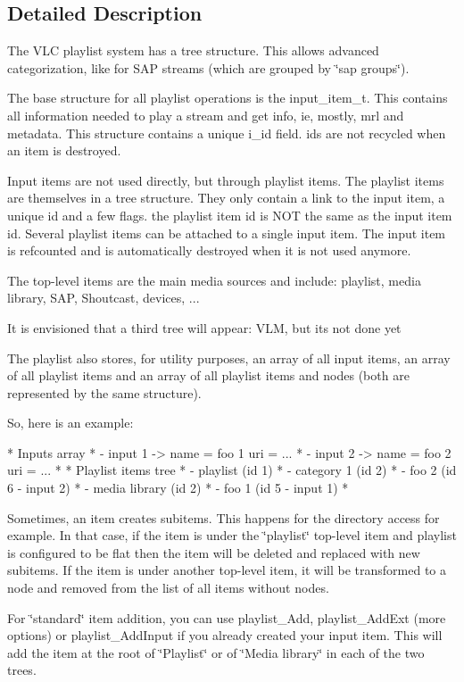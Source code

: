 \subsection{Detailed Description}
The V\+LC playlist system has a tree structure. This allows advanced categorization, like for S\+AP streams (which are grouped by \char`\"{}sap groups\char`\"{}).

The base structure for all playlist operations is the input\+\_\+item\+\_\+t. This contains all information needed to play a stream and get info, ie, mostly, mrl and metadata. This structure contains a unique i\+\_\+id field. ids are not recycled when an item is destroyed.

Input items are not used directly, but through playlist items. The playlist items are themselves in a tree structure. They only contain a link to the input item, a unique id and a few flags. the playlist item id is N\+OT the same as the input item id. Several playlist items can be attached to a single input item. The input item is refcounted and is automatically destroyed when it is not used anymore.

The top-\/level items are the main media sources and include\+: playlist, media library, S\+AP, Shoutcast, devices, ...

It is envisioned that a third tree will appear\+: V\+LM, but it\textquotesingle{}s not done yet

The playlist also stores, for utility purposes, an array of all input items, an array of all playlist items and an array of all playlist items and nodes (both are represented by the same structure).

So, here is an example\+: \begin{DoxyVerb}* Inputs array
*  - input 1 -> name = foo 1 uri = ...
*  - input 2 -> name = foo 2 uri = ...
*
* Playlist items tree
* - playlist (id 1)
*    - category 1 (id 2)
*      - foo 2 (id 6 - input 2)
* - media library (id 2)
*    - foo 1 (id 5 - input 1)
* \end{DoxyVerb}


Sometimes, an item creates subitems. This happens for the directory access for example. In that case, if the item is under the \char`\"{}playlist\char`\"{} top-\/level item and playlist is configured to be flat then the item will be deleted and replaced with new subitems. If the item is under another top-\/level item, it will be transformed to a node and removed from the list of all items without nodes.

For \char`\"{}standard\char`\"{} item addition, you can use playlist\+\_\+\+Add, playlist\+\_\+\+Add\+Ext (more options) or playlist\+\_\+\+Add\+Input if you already created your input item. This will add the item at the root of \char`\"{}\+Playlist\char`\"{} or of \char`\"{}\+Media library\char`\"{} in each of the two trees.

